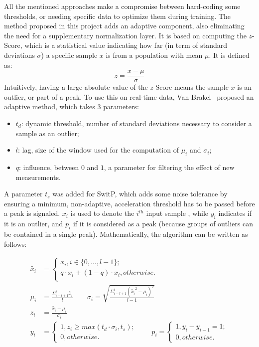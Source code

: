 \documentclass[a4paper, oneside]{discothesis}
\begin{document}
All the mentioned approaches make a compromise between hard-coding some thresholds, or needing specific data to optimize them during training. The method proposed in this project adds an adaptive component, also eliminating the need for a supplementary normalization layer. It is based on computing the $z$-Score, which is a statistical value indicating how far (in term of standard deviations $\sigma$) a specific sample $x$ is from a population with mean $\mu$. It is defined as:
\begin{equation*} z=\frac{x-\mu}{\sigma} \end{equation*}
Intuitively, having a large absolute value of the $z$-Score means the sample $x$ is an outlier, or part of a peak. To use this on real-time data, Van Brakel~\cite{JPVB16} proposed an adaptive method, which takes $3$ parameters:
\begin{itemize}
    \item $t_d$: dynamic threshold, number of standard deviations necessary to consider a sample as an outlier;
    \item $l$: lag, size of the window used for the computation of $\mu_i$ and $\sigma_i$;
    \item $q$: influence, between $0$ and $1$, a parameter for filtering the effect of new measurements.
\end{itemize}
A parameter $t_{s}$ was added for SwitP, which adds some noise tolerance by ensuring a minimum, non-adaptive, acceleration threshold has to be passed before a peak is signaled. $x_i$ is used to denote the $i^{th}$ input sample , while $y_i$ indicates if it is an outlier, and $p_i$ if it is considered as a peak (because groups of outliers can be contained in a single peak). Mathematically, the algorithm can be written as follows:

\begin{align*}
    \tilde{x_i} &= \begin{cases}
    x_i, i \in \{0,\dots, l-1\};\\
    q\cdot x_i + (1-q)\cdot x_i, otherwise.\\
    \end{cases}\\
    \mu_i &= \frac{\Sigma_{i-l+1}^{i}\tilde{x_{i}}}{l} \qquad \sigma_i = \sqrt{\frac{\Sigma_{i-l+1}^{i}\left(\tilde{x_{i}}^2 - \mu_i\right)^2}{l-1}}\\
    z_i &= \frac{\tilde{x_i}-\mu_i}{\sigma_i}\\
    y_i &= \begin{cases}
    1, z_i \geq max(t_d\cdot \sigma_i, t_s);\\
    0, otherwise.
    \end{cases}\qquad
    p_i = \begin{cases}
    1, y_i-y_{i-1}=1;\\
    0, otherwise.
    \end{cases}
\end{align*}
\end{document}
